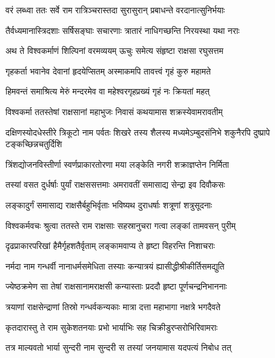 \twolineshloka
{वरं लब्ध्वा ततः सर्वे राम रात्रिञ्चरास्तदा}
{सुरासुरान् प्रबाधन्ते वरदानात्सुनिर्भयाः} %

\twolineshloka
{तैर्वध्यमानास्त्रिदशाः सर्षिसङ्घाः सचारणाः}
{त्रातारं नाधिगच्छन्ति निरयस्था यथा नराः} %

\twolineshloka
{अथ ते विश्वकर्माणं शिल्पिनां वरमव्ययम्}
{ऊचुः समेत्य संहृष्टा राक्षसा रघुसत्तम} %

\twolineshloka
{गृहकर्ता भवानेव देवानां हृदयेप्सितम्}
{अस्माकमपि तावत्त्वं गृहं कुरु महामते} %

\twolineshloka
{हिमवन्तं समाश्रित्य मेरुं मन्दरमेव वा}
{महेश्वरगृहप्रख्यं गृहं नः क्रियतां महत्} %

\twolineshloka
{विश्वकर्मा ततस्तेषां राक्षसानां महाभुजः}
{निवासं कथयामास शक्रस्येवामरावतीम्} %

\threelineshloka
{दक्षिणस्योदधेस्तीरे त्रिकूटो नाम पर्वतः}
{शिखरे तस्य शैलस्य मध्यमेऽम्बुदसंनिभे}
{शकुनैरपि दुष्प्रापे टङ्कच्छिन्नचतुर्दिशि} %

\twolineshloka
{त्रिंशद्योजनविस्तीर्णा स्वर्णप्राकारतोरणा}
{मया लङ्केति नगरी शक्राज्ञप्तेन निर्मिता} %

\twolineshloka
{तस्यां वसत दुर्धर्षाः पुर्यां राक्षससत्तमाः}
{अमरावतीं समासाद्य सेन्द्रा इव दिवौकसः} %

\twolineshloka
{लङ्कादुर्गं समासाद्य राक्षसैर्बहुभिर्वृताः}
{भविष्यथ दुराधर्षाः शत्रूणां शत्रुसूदनाः} %

\twolineshloka
{विश्वकर्मवचः श्रुत्वा ततस्ते राम राक्षसाः}
{सहस्रानुचरा गत्वा लङ्कां तामवसन् पुरीम्} %

\twolineshloka
{दृढप्राकारपरिखां हैमैर्गृहशतैर्वृताम्}
{लङ्कामवाप्य ते हृष्टा विहरन्ति निशाचराः} %

\twolineshloka
{नर्मदा नाम गन्धर्वी नानाधर्मसमेधिता}
{तस्याः कन्यात्रयं ह्यासीद्धीश्रीकीर्तिसमद्युति} %

\twolineshloka
{ज्येष्ठक्रमेण सा तेषां राक्षसानामराक्षसी}
{कन्यास्ताः प्रददौ हृष्टा पूर्णचन्द्रनिभाननाः} %

\twolineshloka
{त्रयाणां राक्षसेन्द्राणां तिस्रो गन्धर्वकन्यकाः}
{मात्रा दत्ता महाभागा नक्षत्रे भगदैवते} %

\twolineshloka
{कृतदारास्तु ते राम सुकेशतनयाः प्रभो}
{भार्याभिः सह चिक्रीडुरप्सरोभिरिवामराः} %

\twolineshloka
{तत्र माल्यवतो भार्या सुन्दरी नाम सुन्दरी}
{स तस्यां जनयामास यदपत्यं निबोध तत्} %

